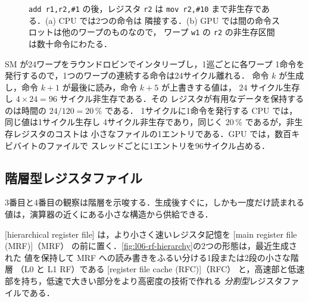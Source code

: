 \documentclass[../main.tex]{subfiles}
\begin{document}
\begin{figure}[tb]
  \centering
  
  \caption{\texttt{add r1,r2,\#1} の後，レジスタ \texttt{r2} は
    \texttt{mov r2,\#10} まで非生存である．(a) CPU では2つの命令は
    隣接する．(b) GPU では間の命令スロットは他のワープのものなので，
    ワープ \texttt{w1} の \texttt{r2} の非生存区間は数十命令にわたる．}
  \label{fig:l06-live-dead}
\end{figure}


\begin{example}
  \label{ex:l06-live-dead}
  SM が24ワープをラウンドロビンでインタリーブし，1巡ごとに各ワープ
  1命令を発行するので，1つのワープの連続する命令は24サイクル離れる．
  命令 $k$ が生成し，命令 $k+1$ が最後に読み，命令 $k+5$ が上書きする値は，
  $24$ サイクル生存し $4 \times 24 = 96$ サイクル非生存である．その
  レジスタが有用なデータを保持するのは時間の $24/120 = 20\,\%$ である．
  1サイクルに1命令を発行する CPU では，同じ値は1サイクル生存し
  4サイクル非生存であり，同じく 20\,\% であるが，非生存レジスタのコストは
  小さなファイルの1エントリである．GPU では，数百キビバイトのファイルで
  スレッドごとに1エントリを96サイクル占める．
\end{example}

\subsection{階層型レジスタファイル}

3番目と4番目の観察は階層を示唆する．生成後すぐに，しかも一度だけ読まれる
値は，演算器の近くにある小さな構造から供給できる．

\begin{definition}[階層型レジスタファイル]
  \label{def:l06-hierarchical-rf}
  [hierarchical register file]
  は，より小さく速いレジスタ記憶を
  [main register file (MRF)]（MRF）
  の前に置く．\cref{fig:l06-rf-hierarchy}の2つの形態は，最近生成された
  値を保持して MRF への読み書きをふるい分ける1段または2段の小さな階層
  （L0 と L1 RF）である
  [register file cache (RFC)]（RFC）
  と，高速部と低速部を持ち，低速で大きい部分をより高密度の技術で作れる
  \emph{分割型}レジスタファイルである．
\end{definition}
\end{document}
